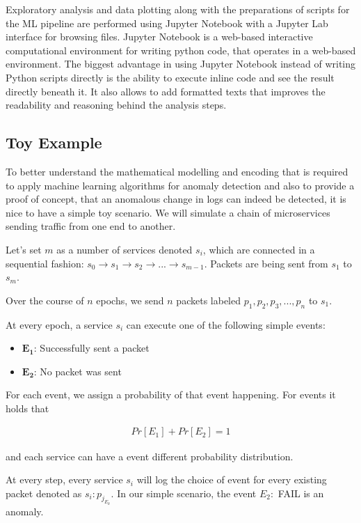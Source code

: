 Exploratory analysis and data plotting along with the preparations of scripts for the ML pipeline are performed using Jupyter Notebook with a Jupyter Lab interface for browsing files. Jupyter Notebook is a web-based interactive computational environment for writing python code, that operates in a web-based environment. The biggest advantage in using Jupyter Notebook instead of writing Python scripts directly is the ability to execute inline code and see the result directly beneath it. It also allows to add formatted texts that improves the readability and reasoning behind the analysis steps.


\subsection{Toy Example}
To better understand the mathematical modelling and encoding that is required to apply machine learning algorithms for anomaly detection and also to provide a proof of concept, that an anomalous change in logs can indeed be detected, it is nice to have a simple toy scenario. We will simulate a chain of microservices sending traffic from one end to another.

Let's set $m$ as a number of services denoted $s_i$, which are connected in a sequential fashion: $s_0 \rightarrow s_1 \rightarrow s_2 \rightarrow ... \rightarrow s_{m-1}$. Packets are being sent from $s_1$ to $s_m$.

Over the course of $n$ epochs, we send $n$ packets labeled $p_1, p_2, p_3, ..., p_n$ to $s_1$.

At every epoch, a service $s_i$ can execute one of the following simple events: 

\begin{itemize}
    \item $\mathbf{E_1}$: Successfully sent a packet
    \item $\mathbf{E_2}$: No packet was sent
\end{itemize}

For each event, we assign a probability of that event happening. For events it holds that 

\begin{gather*}
    Pr[E_1] + Pr[E_2] = 1
\end{gather*}

and each service can have a event different probability distribution.

At every step, every service $s_i$ will log the choice of event for every existing packet denoted as $s_i: p_{j_{E_k}}$. In our simple scenario, the event $E_2:$ FAIL is an anomaly. 

